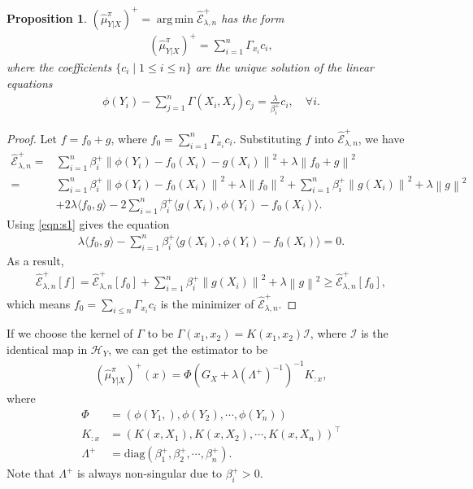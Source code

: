 \documentclass[a4paper]{article}
\newcommand{\up}{\mathrm}
\renewcommand{\cal}{\mathcal}
\newcommand{\norm}[1]{\left\lVert#1\right\rVert}
\newcommand{\T}{\intercal}
\DeclareMathOperator*{\argmin}{arg\,min}
\newtheorem{proposition}{Proposition}
\def\eplus{\widehat{\cal{E}}_{\lambda,n}^+}
\def\muyxplus{(\widehat{\mu}_{Y|X}^\pi)^+}
\begin{document}
\begin{proposition}\label{prop:bayes+}
$\muyxplus = \argmin \eplus$ has the form
\begin{align}
\muyxplus = \sum_{i=1}^n \Gamma_{x_i}c_i,
\end{align}
where the coefficients $\{c_i\mid 1\leq i\leq n\}$ are the unique solution of the linear equations
\begin{align}
\phi(Y_i) - \sum_{j=1}^n \Gamma(X_i,X_j)c_j = \frac{\lambda}{\beta_i^+} c_i,\quad \forall i.\label{eqn:s1}
\end{align}
\end{proposition}
\begin{proof}
Let $f = f_0 +g$, where $f_0 = \sum_{i=1}^n \Gamma_{x_i}c_i$. Substituting $f$ into $\eplus$, we have
\begin{align}
\eplus =& \sum_{i=1}^n \beta_i^+ \norm{\phi(Y_i) - f_0(X_i) - g(X_i)}^2 + \lambda \norm{f_0+g}^2\\
=& \sum_{i=1}^n\beta_i^+ \norm{\phi(Y_i)-f_0(X_i)}^2 + \lambda\norm{f_0}^2 + \sum_{i=1}^n \beta_i^+ \norm{g(X_i)}^2 + \lambda \norm{g}^2\\
 &+ 2\lambda\langle f_0,g\rangle - 2\sum_{i=1}^n \beta_i^+ \langle g(X_i) ,\phi(Y_i) - f_0(X_i)\rangle.
\end{align}
Using \eqref{eqn:s1} gives the equation
\begin{align}
\lambda\langle f_0,g\rangle - \sum_{i=1}^n \beta_i^+ \langle g(X_i) ,\phi(Y_i) - f_0(X_i)\rangle = 0.
\end{align}
As a result,
\begin{align}
\eplus[f] = \eplus[f_0] + \sum_{i=1}^n \beta_i^+ \norm{g(X_i)}^2 + \lambda \norm{g}^2 \geq \eplus[f_0],
\end{align}
which means $f_0=\sum_{i\leq n}\Gamma_{x_i}c_i$ is the minimizer of $\eplus$.
\end{proof}
If we choose the kernel of $\Gamma$ to be $\Gamma(x_1,x_2) = K(x_1,x_2)\cal{I}$, where $\cal{I}$ is the identical map in $\cal{H}_Y$, we can get the estimator to be
\begin{align}
\boxed{\muyxplus(x) = \Phi(G_X + \lambda(\Lambda^+)^{-1})^{-1}K_{:x}}\label{eqn:bayes},
\end{align}
where
\begin{align*}
\Phi &= (\phi(Y_1,),\phi(Y_2),\cdots,\phi(Y_n))\\
K_{:x} &= (K(x,X_1),K(x,X_2),\cdots,K(x,X_n))^\T\\
\Lambda^+ &= \up{diag}(\beta_1^+,\beta_2^+,\cdots,\beta_n^+).
\end{align*}
Note that $\Lambda^+$ is always non-singular due to $\beta_i^+ > 0$.
\end{document}
